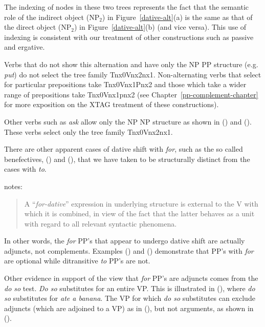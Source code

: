 The indexing of nodes in these two trees represents the fact that the semantic
role of the indirect object (NP$_2$) in Figure~\ref{dative-alt}(a) is the same
as that of the direct object (NP$_2$) in Figure~\ref{dative-alt}(b) (and vice
versa).  This use of indexing is consistent with our treatment of other
constructions such as passive and ergative.

Verbs that do not show this alternation and have only the NP PP
structure (e.g. {\it put\/}) do not select the tree family
Tnx0Vnx2nx1.  Non-alternating verbs that select for particular prepositions 
take
Tnx0Vnx1Pnx2 and those which take a wider range of prepositions take
Tnx0Vnx1pnx2 (see Chapter~\ref{pp-complement-chapter} for more
exposition on the XTAG treatment of these constructions).  

Other verbs such as {\it ask} allow only the NP NP structure as shown
in () and ().  These verbs select only the tree family
Tnx0Vnx2nx1.


There are other apparent cases of dative shift with {\it for}, such as 
the so called benefectives,
() and (), that we have taken to be structurally distinct from the
cases with {\it to}.


\cite{mccawley88} notes:

\begin{quote}
A ``{\it for-dative}'' expression in underlying structure is external
to the V with which it is combined, in view of the fact that the
latter behaves as a unit with regard to all relevant syntactic
phenomena.
\end{quote}


In other words, the {\it for} PP's that appear to undergo dative shift are
actually adjuncts, not complements. Examples () and () demonstrate
that PP's with {\it for} are optional while ditransitive {\it to} PP's are not.


Other evidence in support of the view that {\it for} PP's are adjuncts
comes from the {\it do so} test.  {\it Do so} substitutes for an entire VP. This
is illustrated in (), where {\it do so} substitutes for {\it ate a
banana}. The VP for which {\it do so} substitutes can exclude adjuncts (which
are adjoined to a VP) as in (), but not arguments, as shown in (). 

